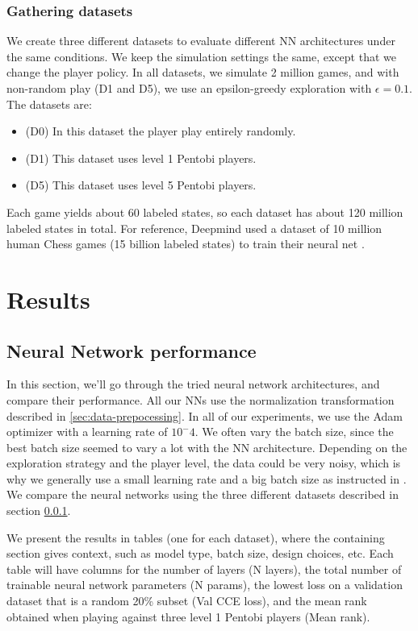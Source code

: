 \documentclass{article}
\begin{document}
\subsubsection{Gathering datasets}
\label{sec:gathering-datasets}
We create three different datasets to evaluate different NN architectures under the same conditions. We keep the simulation settings the same, except that we change the player policy. In all datasets, we simulate 2 million games, and with non-random play (D1 and D5), we use an epsilon-greedy exploration with $\epsilon=0.1$.
The datasets are:
\begin{itemize}
    \item (D0) In this dataset the player play entirely randomly.
    \item (D1) This dataset uses level 1 Pentobi players.
    \item (D5) This dataset uses level 5 Pentobi players.
\end{itemize}

\noindent Each game yields about 60 labeled states, so each dataset has about 120 million labeled states in total. For reference, Deepmind used a dataset of 10 million human Chess games (15 billion labeled states) to train their neural net \cite{ruoss2024grandmaster}.

\section{Results}

\subsection{Neural Network performance}
In this section, we'll go through the tried neural network architectures, and compare their performance. All our NNs use the normalization transformation described in \ref{sec:data-prepocessing}. In all of our experiments, we use the Adam optimizer with a learning rate of $10^-4$. We often vary the batch size, since the best batch size seemed to vary a lot with the NN architecture. Depending on the exploration strategy and the player level, the data could be very noisy, which is why we generally use a small learning rate and a big batch size as instructed in \cite{rolnick2017deep}.
We compare the neural networks using the three different datasets described in section \ref{sec:gathering-datasets}.

We present the results in tables (one for each dataset), where the containing section gives context, such as model type, batch size, design choices, etc. Each table will have columns for the number of layers (N layers), the total number of trainable neural network parameters (N params), the lowest loss on a validation dataset that is a random 20\% subset (Val CCE loss), and the mean rank obtained when playing against three level 1 Pentobi players (Mean rank).
\end{document}

